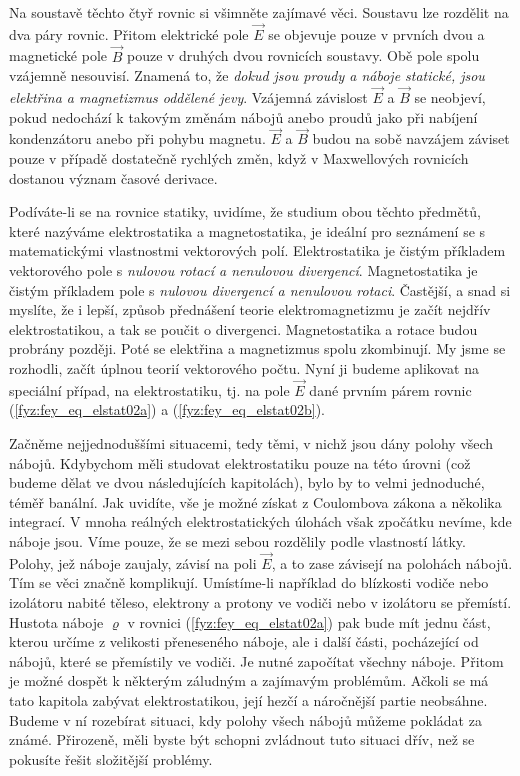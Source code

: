     Na soustavě těchto čtyř rovnic si všimněte zajímavé věci. Soustavu lze rozdělit na dva páry 
    rovnic. Přitom elektrické pole \(\vec{E}\) se objevuje pouze v prvních dvou a magnetické pole 
    \(\vec{B}\) pouze v druhých dvou rovnicích soustavy. Obě pole spolu vzájemně nesouvisí. Znamená 
    to, že \emph{dokud jsou proudy a náboje statické, jsou elektřina a magnetizmus oddělené jevy}. 
    Vzájemná závislost \(\vec{E}\) a \(\vec{B}\) se neobjeví, pokud nedochází k takovým změnám 
    nábojů anebo proudů jako při nabíjení kondenzátoru anebo při pohybu magnetu. \(\vec{E}\) a 
    \(\vec{B}\) budou na sobě navzájem záviset pouze v případě dostatečně rychlých změn, když v 
    Maxwellových rovnicích dostanou význam časové derivace.
     
    Podíváte-li se na rovnice statiky, uvidíme, že studium obou těchto předmětů, které nazýváme     
    elektrostatika a magnetostatika, je ideální pro seznámení se s matematickými vlastnostmi 
    vektorových polí. Elektrostatika je čistým příkladem vektorového pole s \emph{nulovou rotací a 
    nenulovou divergencí}. Magnetostatika je čistým příkladem pole s \emph{nulovou divergencí a 
    nenulovou rotaci}. Častější, a snad si myslíte, že i lepší, způsob přednášení teorie 
    elektromagnetizmu je začít nejdřív elektrostatikou, a tak se poučit o divergenci. Magnetostatika 
    a rotace budou probrány později. Poté se elektřina a magnetizmus spolu zkombinují. My jsme se 
    rozhodli, začít úplnou teorií vektorového počtu. Nyní ji budeme aplikovat na speciální případ, 
    na elektrostatiku, tj. na pole \(\vec{E}\) dané prvním párem rovnic (\ref{fyz:fey_eq_elstat02a}) 
    a (\ref{fyz:fey_eq_elstat02b}).
     
    Začněme nejjednoduššími situacemi, tedy těmi, v nichž jsou dány polohy všech nábojů. Kdybychom 
    měli studovat elektrostatiku pouze na této úrovni (což budeme dělat ve dvou následujících 
    kapitolách), bylo by to velmi jednoduché, téměř banální. Jak uvidíte, vše je možné získat z 
    Coulombova zákona a  několika integrací. V mnoha reálných elektrostatických úlohách však 
    zpočátku nevíme, kde náboje jsou. Víme pouze, že se mezi sebou rozdělily podle vlastností látky. 
    Polohy, jež náboje zaujaly, závisí na poli \(\vec{E}\), a to zase závisejí na polohách nábojů. 
    Tím se věci značně komplikují. Umístíme-li například do blízkosti vodiče nebo izolátoru nabité 
    těleso, elektrony a protony ve vodiči nebo v izolátoru se přemístí. Hustota náboje \(\varrho\) v 
    rovnici (\ref{fyz:fey_eq_elstat02a}) pak bude mít jednu část, kterou určíme z velikosti 
    přeneseného náboje, ale i další části, pocházející od nábojů, které se přemístily ve vodiči. Je 
    nutné započítat všechny náboje. Přitom je možné dospět k některým záludným a zajímavým 
    problémům. Ačkoli se má tato kapitola zabývat elektrostatikou, její hezčí a náročnější partie 
    neobsáhne. Budeme v ní rozebírat situaci, kdy polohy všech nábojů můžeme pokládat za známé. 
    Přirozeně, měli byste být schopni zvládnout tuto situaci dřív, než se pokusíte řešit složitější 
    problémy.
    

